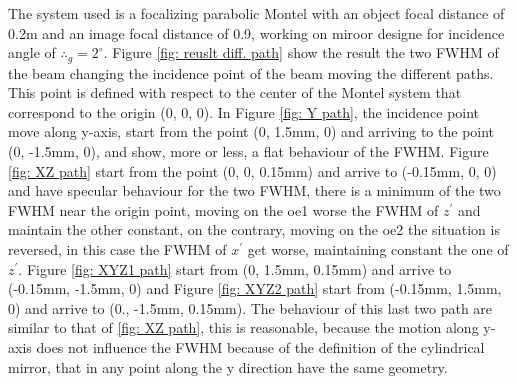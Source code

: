 The system used is a focalizing parabolic Montel with an object focal distance of 0.2m and an image focal distance of 0.9, working on miroor designe for incidence angle of $\therefore_g = 2^{\circ}$. Figure \ref{fig: reuslt diff. path} show the result the two FWHM of the beam changing the incidence point of the beam moving the different paths. This point is defined with respect to the center of the Montel system that correspond to the origin (0, 0, 0). In Figure \ref{fig: Y path}, the incidence point move along y-axis, start from the point (0, 1.5mm, 0) and arriving to the point (0, -1.5mm, 0), and show, more or less, a flat behaviour of the FWHM. Figure \ref{fig: XZ path} start from the point (0, 0, 0.15mm) and arrive to (-0.15mm, 0, 0) and have specular behaviour for the two FWHM, there is a minimum of the two FWHM near the origin point, moving on the oe1 worse the FWHM of $z^{'} $ and maintain the other constant, on the contrary, moving on the oe2 the situation is reversed, in this case the FWHM of $x^{'} $ get worse, maintaining constant the one of $z^{'} $. Figure \ref{fig: XYZ1 path} start from (0, 1.5mm, 0.15mm) and arrive to (-0.15mm, -1.5mm, 0) and Figure \ref{fig: XYZ2 path} start from (-0.15mm, 1.5mm, 0) and arrive to (0., -1.5mm, 0.15mm). The behaviour of this last two path are similar to that of \ref{fig: XZ path}, this is reasonable, because the motion along y-axis does not influence the FWHM because of the definition of the cylindrical mirror, that in any point along the y direction have the same geometry.
\\
%
%
